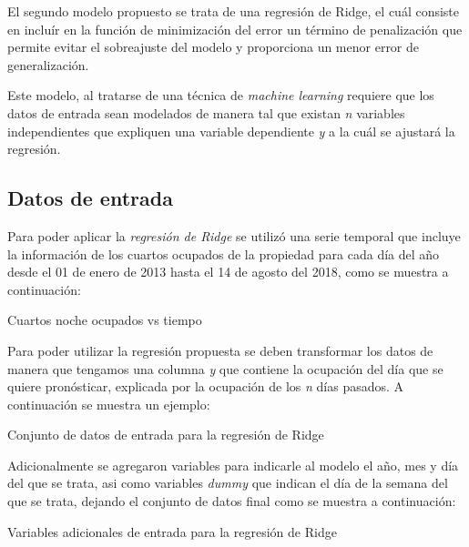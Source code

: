 El segundo modelo propuesto se trata de una regresión de Ridge, el cuál consiste en incluír en la función de minimización del error un término de penalización que permite evitar el sobreajuste del modelo y proporciona un menor error de generalización.

Este modelo, al tratarse de una técnica de \emph{machine learning} requiere que los datos de entrada sean modelados de manera tal que existan \emph{n} variables independientes que expliquen una variable dependiente \emph{y} a la cuál se ajustará la regresión.

\subsection*{Datos de entrada}

Para poder aplicar la \emph{regresión de Ridge} se utilizó una serie temporal que incluye la información de los cuartos ocupados de la propiedad para cada día del año desde el 01 de enero de 2013 hasta el 14 de agosto del 2018, como se muestra a continuación:

\begin{table}[H]
  \centering
  \par
  \caption{Cuartos noche ocupados vs tiempo}
\end{table}

Para poder utilizar la regresión propuesta se deben transformar los datos de manera que tengamos una columna \emph{y} que contiene la ocupación del día que se quiere pronósticar, explicada por la ocupación de los \emph{n} días pasados. A continuación se muestra un ejemplo:

\begin{table}[H]
  \centering
  \par
  \caption{Conjunto de datos de entrada para la regresión de Ridge}
\end{table}

Adicionalmente se agregaron variables para indicarle al modelo el año, mes y día del que se trata, asi como variables \emph{dummy} que indican el día de la semana del que se trata, dejando el conjunto de datos final como se muestra a continuación:

\begin{table}[H]
  \centering
  \par
  \caption{Variables adicionales de entrada para la regresión de Ridge}
\end{table}

